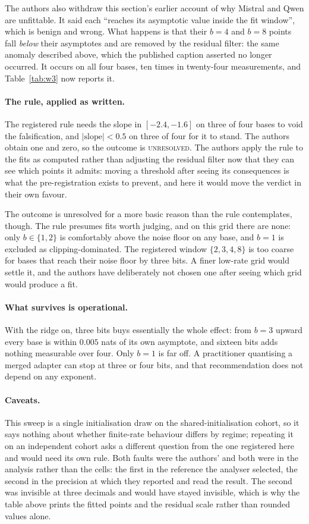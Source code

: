 The authors also withdraw this section's earlier account of why Mistral and Qwen are
unfittable. It said each ``reaches its asymptotic value inside the fit
window'', which is benign and wrong. What happens is that their $b=4$ and
$b=8$ points fall \emph{below} their asymptotes and are removed by the
residual filter: the same anomaly described above, which the published
caption asserted no longer occurred. It occurs on all four bases, ten times
in twenty-four measurements, and Table~\ref{tab:w3} now reports it.

\paragraph{The rule, applied as written.} The registered rule needs the
slope in $[-2.4, -1.6]$ on three of four bases to void the falsification,
and $|\mathrm{slope}| < 0.5$ on three of four for it to stand. The authors obtain
one and zero, so the outcome is \textsc{unresolved}. The authors apply the rule to
the fits as computed rather than adjusting the residual filter now that they
can see which points it admits: moving a threshold after seeing its
consequences is what the pre-registration exists to prevent, and here it
would move the verdict in their own favour.

The outcome is unresolved for a more basic reason than the rule
contemplates, though. The rule presumes fits worth judging, and on this
grid there are none: only $b \in \{1,2\}$ is comfortably above the noise
floor on any base, and $b=1$ is excluded as clipping-dominated. The
registered window $\{2,3,4,8\}$ is too coarse for bases that reach their
noise floor by three bits. A finer low-rate grid would settle it, and the authors
have deliberately not chosen one after seeing which grid would produce a
fit.

\paragraph{What survives is operational.} With the ridge on, three bits
buys essentially the whole effect: from $b = 3$ upward every base is within
$0.005$ nats of its own asymptote, and sixteen bits adds nothing measurable
over four. Only $b = 1$ is far off. A practitioner quantising a merged
adapter can stop at three or four bits, and that recommendation does not
depend on any exponent.

\paragraph{Caveats.} This sweep is a single initialisation draw on the
shared-initialisation cohort, so it says nothing about whether finite-rate
behaviour differs by regime; repeating it on an independent cohort asks a
different question from the one registered here and would need its own
rule. Both faults were the authors' and both were in the analysis rather than the
cells: the first in the reference the analyser selected, the second in the
precision at which they reported and read the result. The second was
invisible at three decimals and would have stayed invisible, which is why
the table above prints the fitted points and the residual scale rather than
rounded values alone.
